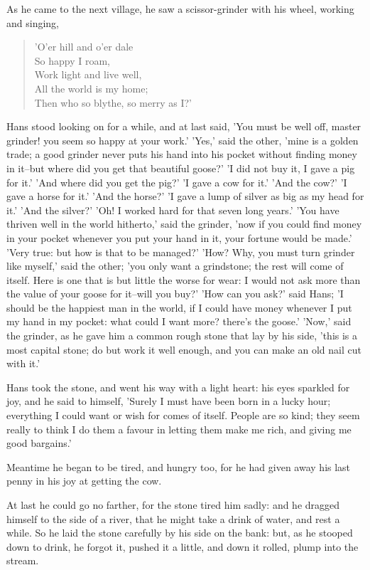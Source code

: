 \documentclass[12pt]{book}
\begin{document}
As he came to the next village, he saw a scissor-grinder with his
wheel, working and singing,

\begin{verse}
 'O'er hill and o'er dale\\
  So happy I roam,\\
  Work light and live well,\\
  All the world is my home;\\
  Then who so blythe, so merry as I?'
\end{verse}

Hans stood looking on for a while, and at last said, 'You must be well
off, master grinder! you seem so happy at your work.' 'Yes,' said the
other, 'mine is a golden trade; a good grinder never puts his hand
into his pocket without finding money in it--but where did you get
that beautiful goose?' 'I did not buy it, I gave a pig for it.' 'And
where did you get the pig?' 'I gave a cow for it.' 'And the cow?' 'I
gave a horse for it.' 'And the horse?' 'I gave a lump of silver as big
as my head for it.' 'And the silver?' 'Oh! I worked hard for that
seven long years.' 'You have thriven well in the world hitherto,' said
the grinder, 'now if you could find money in your pocket whenever you
put your hand in it, your fortune would be made.' 'Very true: but how
is that to be managed?' 'How? Why, you must turn grinder like myself,'
said the other; 'you only want a grindstone; the rest will come of
itself. Here is one that is but little the worse for wear: I would not
ask more than the value of your goose for it--will you buy?' 'How can
you ask?' said Hans; 'I should be the happiest man in the world, if I
could have money whenever I put my hand in my pocket: what could I
want more? there's the goose.' 'Now,' said the grinder, as he gave him
a common rough stone that lay by his side, 'this is a most capital
stone; do but work it well enough, and you can make an old nail cut
with it.'

Hans took the stone, and went his way with a light heart: his eyes
sparkled for joy, and he said to himself, 'Surely I must have been
born in a lucky hour; everything I could want or wish for comes of
itself. People are so kind; they seem really to think I do them a
favour in letting them make me rich, and giving me good bargains.'

Meantime he began to be tired, and hungry too, for he had given away
his last penny in his joy at getting the cow.

At last he could go no farther, for the stone tired him sadly: and he
dragged himself to the side of a river, that he might take a drink of
water, and rest a while. So he laid the stone carefully by his side on
the bank: but, as he stooped down to drink, he forgot it, pushed it a
little, and down it rolled, plump into the stream.
\end{document}
